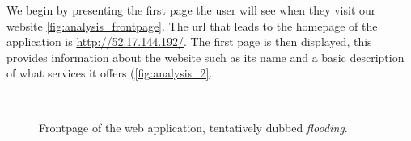 We begin by presenting the first page the user will see when they visit our website \autoref{fig:analysis_frontpage}. The url that leads to the homepage of the application is \url{http://52.17.144.192/}. The first page is then displayed, this provides information about the website such as its name and a basic description of what services it offers (\autoref{fig:analysis_2}.

\begin{figure}[h!]
  \myfloatalign
   \quad
   \quad
   \\
 \caption{Frontpage of the web application, tentatively dubbed \textit{flooding}.}
 \label{fig:analysis_frontpage}
\end{figure}

